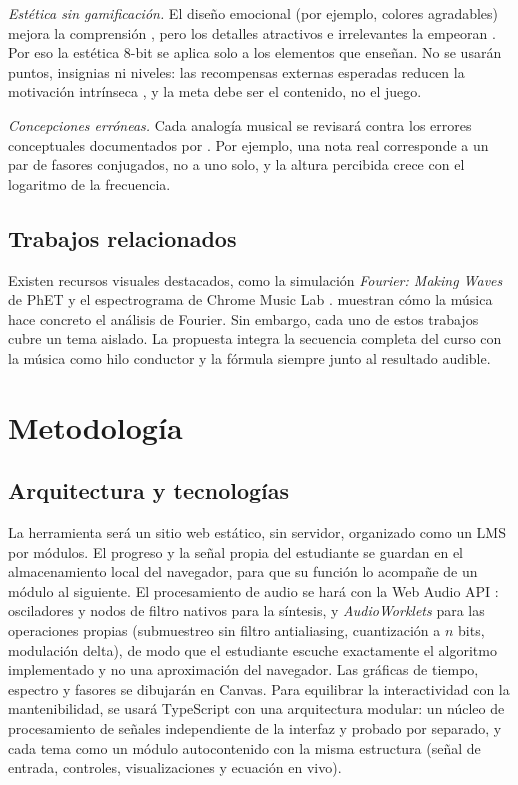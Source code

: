 \documentclass[conference]{IEEEtran}
\begin{document}
\emph{Estética sin gamificación.} El diseño emocional (por ejemplo, colores agradables) mejora la comprensión \citep{brom2018}, pero los detalles atractivos e irrelevantes la empeoran \citep{sundararajan2020}. Por eso la estética 8-bit se aplica solo a los elementos que enseñan. No se usarán puntos, insignias ni niveles: las recompensas externas esperadas reducen la motivación intrínseca \citep{deci1999}, y la meta debe ser el contenido, no el juego.

\emph{Concepciones erróneas.} Cada analogía musical se revisará contra los errores conceptuales documentados por \citet{wage2005}. Por ejemplo, una nota real corresponde a un par de fasores conjugados, no a uno solo, y la altura percibida crece con el logaritmo de la frecuencia.

\subsection{Trabajos relacionados}
Existen recursos visuales destacados, como la simulación \emph{Fourier: Making Waves} de PhET \citep{phet} y el espectrograma de Chrome Music Lab \citep{chromemusiclab}. \citet{muller2021} muestran cómo la música hace concreto el análisis de Fourier. Sin embargo, cada uno de estos trabajos cubre un tema aislado. La propuesta integra la secuencia completa del curso con la música como hilo conductor y la fórmula siempre junto al resultado audible.

\section{Metodología}
\subsection{Arquitectura y tecnologías}
La herramienta será un sitio web estático, sin servidor, organizado como un LMS por módulos. El progreso y la señal propia del estudiante se guardan en el almacenamiento local del navegador, para que su función lo acompañe de un módulo al siguiente. El procesamiento de audio se hará con la Web Audio API \citep{w3c2021}: osciladores y nodos de filtro nativos para la síntesis, y \emph{AudioWorklets} para las operaciones propias (submuestreo sin filtro antialiasing, cuantización a $n$ bits, modulación delta), de modo que el estudiante escuche exactamente el algoritmo implementado y no una aproximación del navegador. Las gráficas de tiempo, espectro y fasores se dibujarán en Canvas. Para equilibrar la interactividad con la mantenibilidad, se usará TypeScript con una arquitectura modular: un núcleo de procesamiento de señales independiente de la interfaz y probado por separado, y cada tema como un módulo autocontenido con la misma estructura (señal de entrada, controles, visualizaciones y ecuación en vivo).
\end{document}
